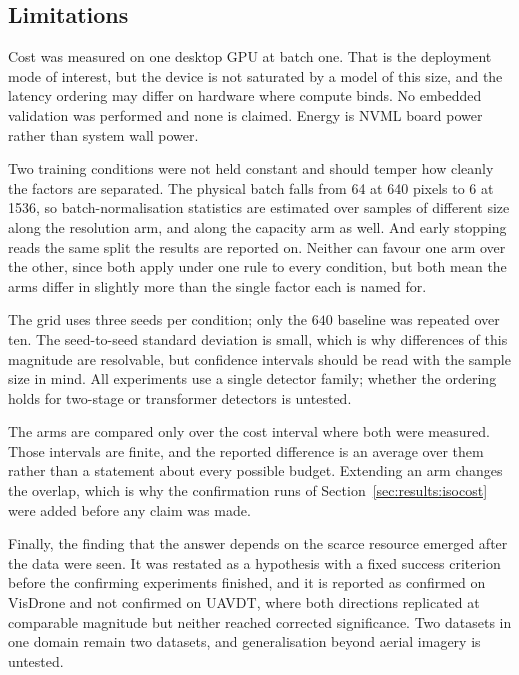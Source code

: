 \subsection{Limitations}
\label{sec:discussion:limitations}

Cost was measured on one desktop GPU at batch one. That is the deployment mode of interest,
but the device is not saturated by a model of this size, and the latency ordering may differ
on hardware where compute binds. No embedded validation was performed and none is claimed. Energy is NVML board power rather
than system wall power.

Two training conditions were not held constant and should temper how cleanly the factors
are separated. The physical batch falls from 64 at 640 pixels to 6 at 1536, so
batch-normalisation statistics are estimated over samples of different size along the
resolution arm, and along the capacity arm as well. And early stopping reads the same split
the results are reported on. Neither can favour one arm over the other, since both apply
under one rule to every condition, but both mean the arms differ in slightly more than the
single factor each is named for.

The grid uses three seeds per condition; only the $640$ baseline was repeated over ten. The
seed-to-seed standard deviation is small, which is why differences of this magnitude are
resolvable, but confidence intervals should be read with the sample size in mind. All
experiments use a single detector family; whether the ordering holds for two-stage or
transformer detectors is untested.

The arms are compared only over the cost interval where both were measured. Those intervals
are finite, and the reported difference is an average over them rather than a statement
about every possible budget. Extending an arm changes the overlap, which is why the
confirmation runs of Section~\ref{sec:results:isocost} were added before any claim was made.

Finally, the finding that the answer depends on the scarce resource emerged after the data
were seen. It was restated as a hypothesis with a fixed success criterion before the
confirming experiments finished, and it is reported as confirmed on VisDrone and not confirmed on UAVDT, where both
directions replicated at comparable magnitude but neither reached corrected significance.
Two datasets in one domain remain two datasets, and generalisation beyond aerial imagery is
untested.
